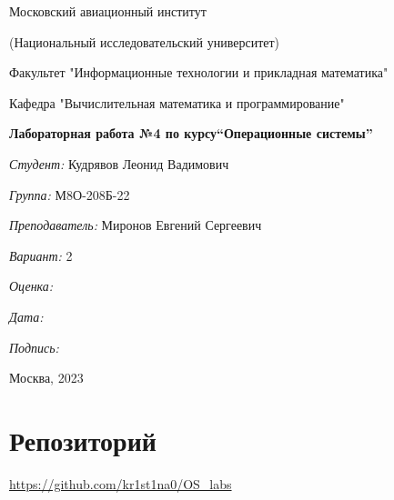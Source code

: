 \documentclass[a4paper, 12pt]{article}
\begin{document}
\thispagestyle{empty}	
\begin{center}
	Московский авиационный институт
	
	(Национальный исследовательский университет)
	
	Факультет "Информационные технологии и прикладная математика"
	
	Кафедра "Вычислительная математика и программирование"
	
\end{center}
\vspace{40ex}
\begin{center}
	\textbf{\large{Лабораторная работа №4 по курсу\linebreak \textquotedblleft Операционные системы\textquotedblright}}
\end{center}
\vspace{35ex}
\begin{flushright}
	\textit{Студент: } Кудрявов Леонид Вадимович
	
	\vspace{2ex}
	\textit{Группа: } М8О-208Б-22
	
	\vspace{2ex}
	\textit{Преподаватель: } Миронов Евгений Сергеевич
	
	\vspace{2ex}
	\textit{Вариант: } 2 
	
	\vspace{2ex}
	\textit{Оценка: } \underline{\quad\quad\quad\quad\quad\quad}
	
	 \vspace{2ex}
	\textit{Дата: } \underline{\quad\quad\quad\quad\quad\quad}
	
	\vspace{2ex}
	\textit{Подпись: } \underline{\quad\quad\quad\quad\quad\quad}
	
\end{flushright}

\vspace{5ex}

\begin{vfill}
	\begin{center}
		Москва, 2023
	\end{center}	
\end{vfill}
\newpage

\begingroup
\color{black}
\tableofcontents\newpage
\endgroup

\section{Репозиторий}
\href{https://github.com/kr1st1na0/OS\_labs}{https://github.com/kr1st1na0/OS\_labs}
\end{document}
